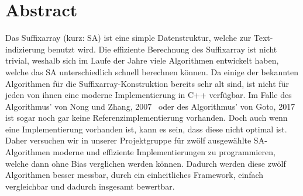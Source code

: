 \chapter*{Abstract}

Das  Suffixarray (kurz: SA) ist eine simple Datenstruktur, welche zur Text-indizierung benutzt wird.
Die effiziente Berechnung des Suffixarray ist nicht trivial, weshalb sich im Laufe der Jahre viele Algorithmen entwickelt haben, welche das SA unterschiedlich schnell berechnen können.
Da einige der bekannten Algorithmen für die Suffixarray-Konstruktion bereits sehr alt sind, ist nicht für jeden von ihnen eine moderne Implementierung in C++ verfügbar.
Im Falle des Algorithmus' von Nong und Zhang, 2007~\cite{saca:10} oder des Algorithmus' von Goto, 2017~\cite{saca:12} ist sogar noch gar keine Referenzimplementierung vorhanden.
Doch auch wenn eine Implementierung vorhanden ist, kann es sein, dass diese nicht optimal ist.
Daher versuchen wir in unserer Projektgruppe für zwölf ausgewählte SA-Algorithmen moderne und effiziente Implementierungen zu programmieren, welche dann ohne Bias verglichen werden können.
Dadurch werden diese zwölf Algorithmen besser messbar, durch ein einheitliches Framework, einfach vergleichbar und dadurch insgesamt bewertbar.
